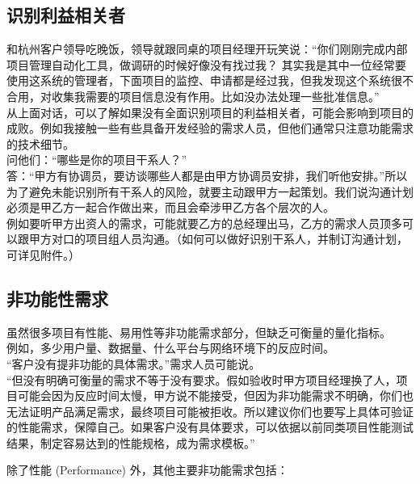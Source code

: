\hypertarget{ux8bc6ux522bux5229ux76caux76f8ux5173ux8005}{%
\subsection{识别利益相关者}\label{ux8bc6ux522bux5229ux76caux76f8ux5173ux8005}}

和杭州客户领导吃晚饭，领导就跟同桌的项目经理开玩笑说：``你们刚刚完成内部项目管理自动化工具，做调研的时候好像没有找过我？
其实我是其中一位经常要使用这系统的管理者，下面项目的监控、申请都是经过我，但我发现这个系统很不合用，对收集我需要的项目信息没有作用。比如没办法处理一些批准信息。''\\
从上面对话，可以了解如果没有全面识别项目的利益相关者，可能会影响到项目的成败。例如我接触一些有些具备开发经验的需求人员，但他们通常只注意功能需求的技术细节。\\
问他们：``哪些是你的项目干系人？''\\
答：``甲方有协调员，要访谈哪些人都是由甲方协调员安排，我们听他安排。''所以为了避免未能识别所有干系人的风险，就要主动跟甲方一起策划。我们说沟通计划必须是甲乙方一起合作做出来，而且会牵涉甲乙方各个层次的人。\\
例如要听甲方出资人的需求，可能就要乙方的总经理出马，乙方的需求人员顶多可以跟甲方对口的项目组人员沟通。（如何可以做好识别干系人，并制订沟通计划，可详见附件。）

\hypertarget{ux975eux529fux80fdux6027ux9700ux6c42}{%
\subsection{非功能性需求}\label{ux975eux529fux80fdux6027ux9700ux6c42}}

虽然很多项目有性能、易用性等非功能需求部分，但缺乏可衡量的量化指标。\\
例如，多少用户量、数据量、什么平台与网络环境下的反应时间。\\
``客户没有提非功能的具体需求。''需求人员可能说。\\
``但没有明确可衡量的需求不等于没有要求。假如验收时甲方项目经理换了人，项目可能会因为反应时间太慢，甲方说不能接受，但因为非功能需求不明确，你们也无法证明产品满足需求，最终项目可能被拒收。所以建议你们也要写上具体可验证的性能需求，保障自己。如果客户没有具体要求，可以依据以前同类项目性能测试结果，制定容易达到的性能规格，成为需求模板。''

除了性能 (Performance) 外，其他主要非功能需求包括：

